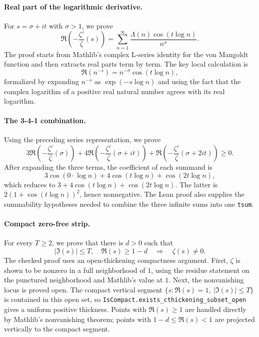\documentclass[11pt,a4paper]{article}
\theoremstyle{remark}
\begin{document}
\paragraph{Real part of the logarithmic derivative.}
For $s=\sigma+it$ with $\sigma>1$, we prove
\[
\Re\!\left(-\frac{\zeta'}{\zeta}(s)\right)
  = \sum_{n=1}^{\infty}
      \frac{\Lambda(n)\cos(t\log n)}{n^\sigma}.
\]
The proof starts from Mathlib's complex L-series identity for the von
Mangoldt function and then extracts real parts term by term.  The key local
calculation is
\[
\Re(n^{-s}) = n^{-\sigma}\cos(t\log n),
\]
formalized by expanding $n^{-s}$ as $\exp(-s\log n)$ and using the fact that
the complex logarithm of a positive real natural number agrees with its real
logarithm.

\paragraph{The 3-4-1 combination.}
Using the preceding series representation, we prove
\[
3\Re\!\left(-\frac{\zeta'}{\zeta}(\sigma)\right)
+4\Re\!\left(-\frac{\zeta'}{\zeta}(\sigma+it)\right)
+\Re\!\left(-\frac{\zeta'}{\zeta}(\sigma+2it)\right)\ge 0.
\]
After expanding the three terms, the coefficient of each summand is
\[
3\cos(0\cdot\log n)+4\cos(t\log n)+\cos(2t\log n),
\]
which reduces to $3+4\cos(t\log n)+\cos(2t\log n)$.  The latter is
$2(1+\cos(t\log n))^2$, hence nonnegative.  The Lean proof also supplies the
summability hypotheses needed to combine the three infinite sums into one
\texttt{tsum}.

\paragraph{Compact zero-free strip.}
For every $T\ge2$, we prove that there is $d>0$ such that
\[
|\Im(s)|\le T,\quad \Re(s)\ge 1-d
  \quad\Longrightarrow\quad \zeta(s)\ne0.
\]
The checked proof uses an open-thickening compactness argument.  First,
\(\zeta\) is shown to be nonzero in a full neighborhood of \(1\), using the
residue statement on the punctured neighborhood and Mathlib's value at \(1\).
Next, the nonvanishing locus is proved open.  The compact vertical segment
\(\{s:\Re(s)=1,\ |\Im(s)|\le T\}\) is contained in this open set, so
\texttt{IsCompact.exists\_cthickening\_subset\_open} gives a uniform positive
thickness.  Points with $\Re(s)\ge1$ are handled directly by Mathlib's
nonvanishing theorem; points with $1-d\le\Re(s)<1$ are projected vertically to
the compact segment.
\end{document}
